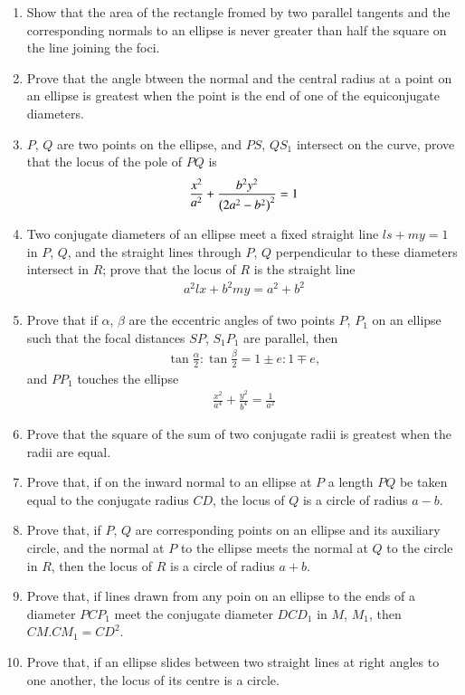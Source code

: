 \begin{enumerate}[1.]
\item Show that the area of the rectangle fromed by two parallel tangents and the corresponding
normals to an ellipse is never greater than half the square on the line joining the foci.
\item Prove that the angle btween the normal and the central radius at a point on an ellipse
is greatest when the point is the end of one of the equiconjugate diameters.
\item $P$, $Q$ are two points on the ellipse, and $PS$, $QS_1$ intersect on the curve, prove that the locus of the pole of $PQ$ is
\begin{align*}
\frac{x^2}{a^2}+\frac{b^2y^2}{\left(2a^2-b^2\right)^2} = 1
\end{align*}
\item Two conjugate diameters of an ellipse meet a fixed straight line $ls+my=1$ in $P$, $Q$, and the straight lines
through $P$, $Q$ perpendicular to these diameters intersect in $R$;  prove that the locus of
$R$ is the straight line
\begin{align*}
a^2lx + b^2my = a^2+b^2
\end{align*}
\item Prove that if $\alpha$, $\beta$ are the eccentric angles of two points $P$, $P_1$ on an ellipse such that
the focal distances $SP$, $S_1P_1$ are parallel, then 
\begin{align*}
\tan\frac{\alpha}{2}:\tan\frac{\beta}{2} = 1\pm e: 1\mp e,
\end{align*}
and $PP_1$ touches the ellipse
\begin{align*}
\frac{x^2}{a^4}+\frac{y^2}{b^4} = \frac{1}{a^2}
\end{align*}
\item Prove that the square of the sum of two conjugate radii is greatest when the radii are equal.
\item Prove that, if on the inward normal to an ellipse at $P$ a length $PQ$ be taken
equal to the conjugate radius $CD$, the locus of $Q$ is a circle of radius $a-b$.
\item Prove that, if $P$, $Q$ are corresponding points on an ellipse and its auxiliary circle, and the
normal at $P$ to the ellipse meets the normal at $Q$ to the circle in $R$, then the locus of $R$ is a circle of radius $a+b$.
\item Prove that, if lines drawn from any poin on an ellipse to the ends of a diameter $PCP_1$ meet the conjugate
diameter $DCD_1$ in $M$, $M_1$, then $CM.CM_1=CD^2$.
\item Prove that, if an ellipse slides between two straight lines
at right angles to one another, the locus of its centre is a circle.
\end{enumerate}